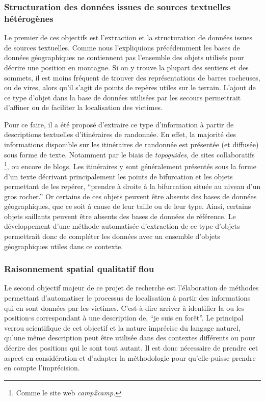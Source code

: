 \subsubsection{Structuration des données issues de sources textuelles
  hétérogènes}
\label{subsec:1-2-3-1}

Le premier de ces objectifs est l'extraction et la structuration de
données issues de sources textuelles. Comme nous l’expliquions
précédemment les bases de données géographiques ne contiennent pas
l'ensemble des objets utilisés pour décrire une position en
montagne. Si on y trouve la plupart des sentiers et des sommets, il
est moins fréquent de trouver des représentations de barres rocheuses,
ou de vires, alors qu'il s'agit de points de repères utiles sur le
terrain. L'ajout de ce type d'objet dans la base de données utilisées
par les secours permettrait d’affiner ou de faciliter la localisation
des victimes.

Pour ce faire, il a été proposé d'extraire ce type d'information à
partir de descriptions textuelles d'itinéraires de randonnée. En
effet, la majorité des informations disponible sur les itinéraires de
randonnée est présentée (et diffusée) sous forme de texte. Notamment
par le biais de \emph{topoguides,} de sites collaboratifs
\footnote{Comme le site web \emph{camp2camp.}}, ou encore de
blogs. Les itinéraires y sont généralement présentés sous la forme
d'un texte décrivant principalement les points de bifurcation et les
objets permettant de les repérer, \eg \enquote{prendre à droite à la
  bifurcation située au niveau d'un gros rocher.} Or certains de ces
objets peuvent être absents des bases de données géographiques, que ce
soit à cause de leur taille ou de leur type. Ainsi, certains objets
saillants peuvent être absents des bases de données de référence. Le
développement d'une méthode automatisée d'extraction de ce type
d'objets permettrait donc de compléter les données avec un ensemble
d'objets géographiques utiles dans ce contexte.

\subsubsection{Raisonnement spatial qualitatif flou}
\label{subsec:1-2-3-2}

Le second objectif majeur de ce projet de recherche est l’élaboration
de méthodes permettant d'automatiser le processus de localisation à
partir des informations qui en sont données par les
victimes. C'est-à-dire arriver à identifier la ou les position⋅s
correspondant à une description de, \eg \enquote{je suis en forêt}. Le
principal verrou scientifique de cet objectif et la nature imprécise
du langage naturel, \ie qu'une même description peut être utilisée
dans des contextes différents ou pour décrire des positions qui le
sont tout autant. Il est donc nécessaire de prendre cet aspect en
considération et d'adapter la méthodologie pour qu'elle puisse prendre
en compte l'imprécision.

